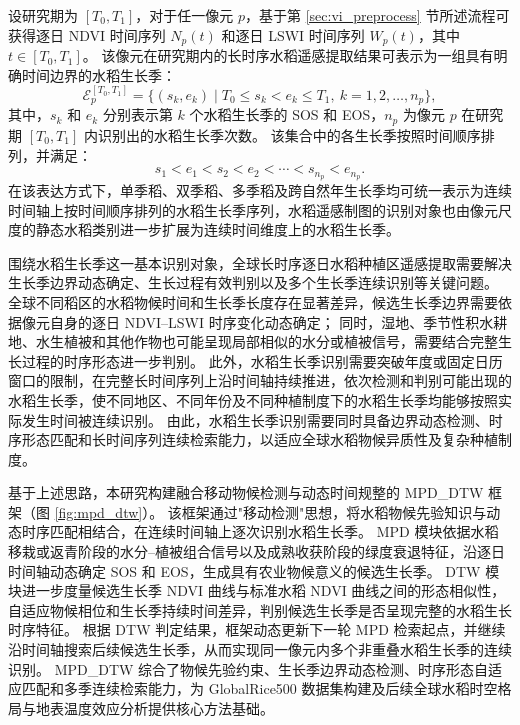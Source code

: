 设研究期为 \([T_0,T_1]\)，对于任一像元 \(p\)，基于第 \ref{sec:vi_preprocess} 节所述流程可获得逐日 NDVI 时间序列 \(N_p(t)\) 和逐日 LSWI 时间序列 \(W_p(t)\)，其中 \(t\in[T_0,T_1]\)。
该像元在研究期内的长时序水稻遥感提取结果可表示为一组具有明确时间边界的水稻生长季：
\begin{equation}
    \mathcal{E}_p^{[T_0,T_1]}
    =
    \{(s_k,e_k)\mid T_0\leq s_k<e_k\leq T_1,\ k=1,2,\ldots,n_p\},
    \label{eq:rice_event_set}
\end{equation}
其中，\(s_k\) 和 \(e_k\) 分别表示第 \(k\) 个水稻生长季的 SOS 和 EOS，\(n_p\) 为像元 \(p\) 在研究期 \([T_0,T_1]\) 内识别出的水稻生长季次数。
该集合中的各生长季按照时间顺序排列，并满足：
\begin{equation}
    s_1<e_1<s_2<e_2<\cdots<s_{n_p}<e_{n_p}.
    \label{eq:rice_event_order}
\end{equation}
在该表达方式下，单季稻、双季稻、多季稻及跨自然年生长季均可统一表示为连续时间轴上按时间顺序排列的水稻生长季序列，水稻遥感制图的识别对象也由像元尺度的静态水稻类别进一步扩展为连续时间维度上的水稻生长季。

围绕水稻生长季这一基本识别对象，全球长时序逐日水稻种植区遥感提取需要解决生长季边界动态确定、生长过程有效判别以及多个生长季连续识别等关键问题。
全球不同稻区的水稻物候时间和生长季长度存在显著差异，候选生长季边界需要依据像元自身的逐日 NDVI--LSWI 时序变化动态确定；
同时，湿地、季节性积水耕地、水生植被和其他作物也可能呈现局部相似的水分或植被信号，需要结合完整生长过程的时序形态进一步判别。
此外，水稻生长季识别需要突破年度或固定日历窗口的限制，在完整长时间序列上沿时间轴持续推进，依次检测和判别可能出现的水稻生长季，使不同地区、不同年份及不同种植制度下的水稻生长季均能够按照实际发生时间被连续识别。
由此，水稻生长季识别需要同时具备边界动态检测、时序形态匹配和长时间序列连续检索能力，以适应全球水稻物候异质性及复杂种植制度。

基于上述思路，本研究构建融合移动物候检测与动态时间规整的 MPD\_DTW 框架（图 \ref{fig:mpd_dtw}）。
该框架通过"移动检测"思想，将水稻物候先验知识与动态时序匹配相结合，在连续时间轴上逐次识别水稻生长季。
MPD 模块依据水稻移栽或返青阶段的水分--植被组合信号以及成熟收获阶段的绿度衰退特征，沿逐日时间轴动态确定 SOS 和 EOS，生成具有农业物候意义的候选生长季。
DTW 模块进一步度量候选生长季 NDVI 曲线与标准水稻 NDVI 曲线之间的形态相似性，自适应物候相位和生长季持续时间差异，判别候选生长季是否呈现完整的水稻生长时序特征。
根据 DTW 判定结果，框架动态更新下一轮 MPD 检索起点，并继续沿时间轴搜索后续候选生长季，从而实现同一像元内多个非重叠水稻生长季的连续识别。
MPD\_DTW 综合了物候先验约束、生长季边界动态检测、时序形态自适应匹配和多季连续检索能力，为 GlobalRice500 数据集构建及后续全球水稻时空格局与地表温度效应分析提供核心方法基础。

